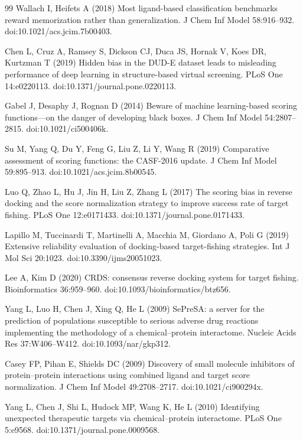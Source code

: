 \documentclass[11pt]{article}
\begin{document}
\begin{thebibliography}{99}
 Wallach I, Heifets A (2018) Most ligand-based classification
benchmarks reward memorization rather than generalization. J Chem Inf Model 58:916--932.
doi:10.1021/acs.jcim.7b00403.

 Chen L, Cruz A, Ramsey S, Dickson CJ, Duca JS, Hornak V, Koes DR,
Kurtzman T (2019) Hidden bias in the DUD-E dataset leads to misleading performance of deep
learning in structure-based virtual screening. PLoS One 14:e0220113.
doi:10.1371/journal.pone.0220113.

 Gabel J, Desaphy J, Rognan D (2014) Beware of machine learning-based
scoring functions---on the danger of developing black boxes. J Chem Inf Model
54:2807--2815. doi:10.1021/ci500406k.

 Su M, Yang Q, Du Y, Feng G, Liu Z, Li Y, Wang R (2019) Comparative
assessment of scoring functions: the CASF-2016 update. J Chem Inf Model 59:895--913.
doi:10.1021/acs.jcim.8b00545.

 Luo Q, Zhao L, Hu J, Jin H, Liu Z, Zhang L (2017) The scoring bias in
reverse docking and the score normalization strategy to improve success rate of target
fishing. PLoS One 12:e0171433. doi:10.1371/journal.pone.0171433.

 Lapillo M, Tuccinardi T, Martinelli A, Macchia M, Giordano A,
Poli G (2019) Extensive reliability evaluation of docking-based target-fishing strategies.
Int J Mol Sci 20:1023. doi:10.3390/ijms20051023.

 Lee A, Kim D (2020) CRDS: consensus reverse docking system for target
fishing. Bioinformatics 36:959--960. doi:10.1093/bioinformatics/btz656.

 Yang L, Luo H, Chen J, Xing Q, He L (2009) SePreSA: a server for
the prediction of populations susceptible to serious adverse drug reactions implementing
the methodology of a chemical--protein interactome. Nucleic Acids Res 37:W406--W412.
doi:10.1093/nar/gkp312.

 Casey FP, Pihan E, Shields DC (2009) Discovery of small molecule
inhibitors of protein--protein interactions using combined ligand and target score
normalization. J Chem Inf Model 49:2708--2717. doi:10.1021/ci900294x.

 Yang L, Chen J, Shi L, Hudock MP, Wang K, He L (2010) Identifying
unexpected therapeutic targets via chemical--protein interactome. PLoS One 5:e9568.
doi:10.1371/journal.pone.0009568.


\end{thebibliography}
\end{document}
